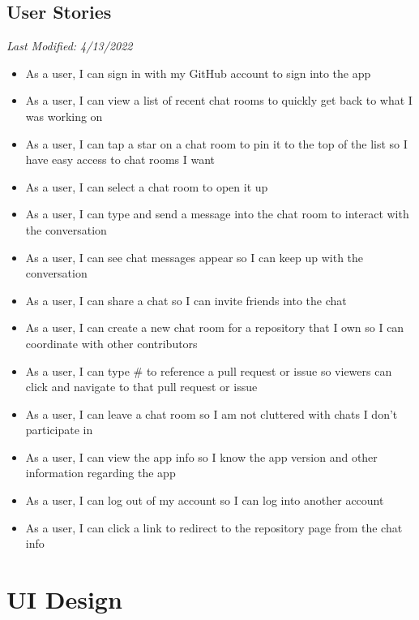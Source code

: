 \documentclass{report}
\begin{document}
\section{User Stories}
\textit{Last Modified: 4/13/2022}
\begin{itemize}
    \item As a user, I can sign in with my GitHub account to sign into the app
    \item As a user, I can view a list of recent chat rooms to quickly get back to what I was working on
    \item As a user, I can tap a star on a chat room to pin it to the top of the list so I have easy access to chat rooms I want
    \item As a user, I can select a chat room to open it up
    \item As a user, I can type and send a message into the chat room to interact with the conversation
    \item As a user, I can see chat messages appear so I can keep up with the conversation
    \item As a user, I can share a chat so I can invite friends into the chat
    \item As a user, I can create a new chat room for a repository that I own so I can coordinate with other contributors
    \item As a user, I can type \# to reference a pull request or issue so viewers can click and navigate to that pull request or issue
    \item As a user, I can leave a chat room so I am not cluttered with chats I don't participate in
    \item As a user, I can view the app info so I know the app version and other information regarding the app
    \item As a user, I can log out of my account so I can log into another account
    \item As a user, I can click a link to redirect to the repository page from the chat info
\end{itemize}

\chapter{UI Design}

\newpage
\end{document}
